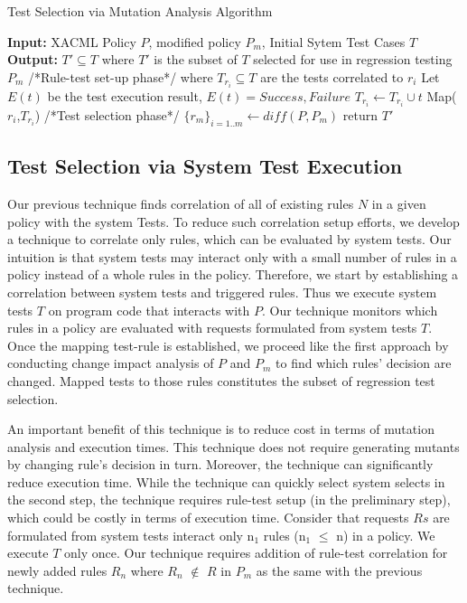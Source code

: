 \begin{algorithmic}
\begin{algorithm}[t]
\caption{Test Selection via Mutation Analysis Algorithm}
\STATE \textbf{Input:} XACML Policy $P$, modified policy $P_{m}$, Initial Sytem Test Cases $T$
\STATE \textbf{Output:} $T' \subseteq T$ where $T'$ is the subset of $T$ selected for use in regression testing $P_{m}$
\STATE /*Rule-test set-up phase*/
 where $T_{r_{i}} \subseteq T$ are the tests correlated to $r_{i}$ 
\STATE Let $E(t)$ be the test execution result, $E(t)={Success, Failure}$
\STATE $T_{r_{i}} \leftarrow T_{r_{i}} \cup t$
\ENDIF
\ENDFOR
\STATE Map($r_{i}$,$T_{r_{i}}$)
\ENDFOR
\STATE /*Test selection phase*/
\STATE $\{r_{m}\}_{i=1..m} \leftarrow diff(P,P_{m})$
\ENDFOR
\STATE return $T'$
\end{algorithm}
\end{algorithmic}

\subsection{Test Selection via System Test Execution}
Our previous technique finds correlation of all of existing rules $N$ in a given policy with the system Tests. To reduce
such correlation setup efforts, we develop a technique to correlate only rules, which can be evaluated
by system tests. Our intuition is that system tests may interact only with a small number of rules in a policy
instead of a whole rules in the policy. Therefore, we start by establishing a correlation between system tests and triggered rules.
Thus we execute system tests $T$ on program code that interacts with $P$. Our technique monitors which rules in a policy are evaluated with
requests formulated from system tests $T$. Once the mapping test-rule is established, we proceed like the first approach by 
conducting change impact analysis of $P$ and $P_m$ to find which rules' decision are changed. Mapped tests to those rules constitutes
 the subset of regression test selection. 


An important benefit of this technique is to reduce cost in terms of mutation analysis and execution times. This technique does not 
require generating mutants by changing rule's decision in turn. Moreover, the technique can significantly reduce execution time.
While the technique can quickly select system selects in the second step, the technique requires rule-test setup (in the preliminary step), 
which could be costly in terms of execution time. Consider that requests $Rs$ are formulated from system tests interact 
only n$_1$ rules (n$_1$ $\leq$ n) in a policy.
We execute $T$ only once. Our technique requires addition of rule-test
correlation for newly added rules $R_n$ where $R_n$ $\notin$ $R$ in $P_m$ as the same with the previous technique.

